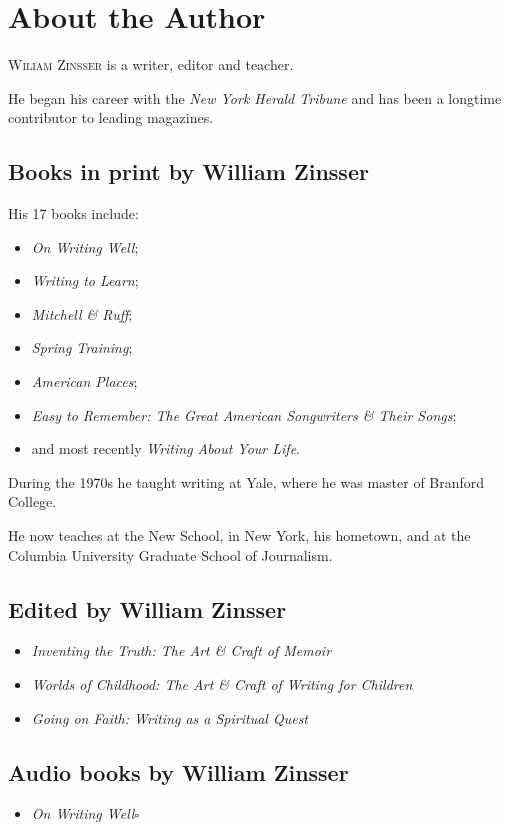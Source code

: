 \documentclass{book}
\numberwithin{equation}{section}
\begin{document}

\chapter{About the Author}

\textsc{Wiliam Zinsser} is a writer, editor and teacher.

He began his career with the \textit{New York Herald Tribune} and has been a longtime contributor to leading magazines.

\section{Books in print by William Zinsser}
His 17 books include:
\begin{itemize}
    \item \textit{On Writing Well};
    \item \textit{Writing to Learn};
    \item \textit{Mitchell \& Ruff};
    \item \textit{Spring Training};
    \item \textit{American Places};
    \item \textit{Easy to Remember: The Great American Songwriters \& Their Songs};
    \item and most recently \textit{Writing About Your Life}.
\end{itemize}
During the 1970s he taught writing at Yale, where he was master of Branford College.

He now teaches at the New School, in New York, his hometown, and at the Columbia University Graduate School of Journalism.

\section{Edited by William Zinsser}
\begin{itemize}
    \item \textit{Inventing the Truth: The Art \& Craft of Memoir}
    \item \textit{Worlds of Childhood: The Art \& Craft of Writing for Children}
    \item \textit{Going on Faith: Writing as a Spiritual Quest}
\end{itemize}

\section{Audio books by William Zinsser}
\begin{itemize}
    \item \textit{On Writing Well}\hfill$\square$
\end{itemize}


\printbibliography[heading=bibintoc]
\end{document}

